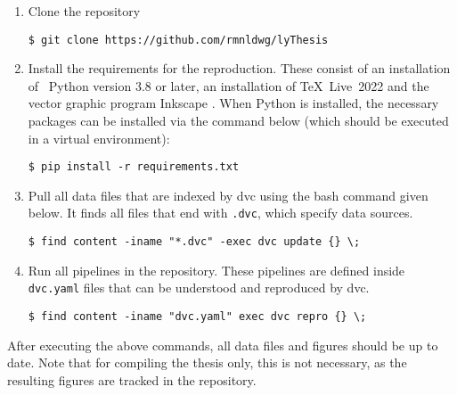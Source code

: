 \documentclass[\relativeRoot/main.tex]{subfiles}
\begin{document}
\begin{enumerate}[label={(\arabic*)}]
    \item Clone the  repository
    \begin{verbatim}$ git clone https://github.com/rmnldwg/lyThesis\end{verbatim}
    
    \item Install the requirements for the reproduction. These consist of an installation of ~Python version 3.8 or later, an installation of \TeX~Live~2022 and the vector graphic program  Inkscape \cite{noauthor_inkscape_2022}. When Python is installed, the necessary packages can be installed via the command below (which should be executed in a virtual environment):
    \begin{verbatim}$ pip install -r requirements.txt\end{verbatim}
    
    \item Pull all data files that are indexed by  \acrshort{dvc} \cite{noauthor_data_2022} using the bash command given below. It finds all files that end with \texttt{.dvc}, which specify data sources.
    \begin{verbatim}$ find content -iname "*.dvc" -exec dvc update {} \;\end{verbatim}
    
    \item Run all pipelines in the repository. These pipelines are defined inside \texttt{dvc.yaml} files that can be understood and reproduced by \acrlong{dvc}.
    \begin{verbatim}$ find content -iname "dvc.yaml" exec dvc repro {} \;\end{verbatim}
\end{enumerate}

After executing the above commands, all data files and figures should be up to date. Note that for compiling the thesis only, this is not necessary, as the resulting figures are tracked in the  repository. 
\end{document}
